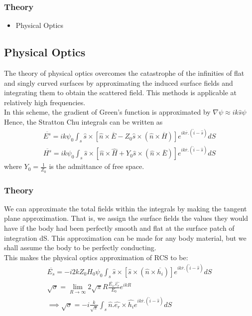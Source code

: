 \documentclass{beamer}
\begin{document}
\begin{frame}
\frametitle{Theory}
\begin{itemize}
 \item Physical Optics
\end{itemize}
\subsection{Physical Optics}
The theory of physical optics overcomes the catastrophe of the infinities of flat and singly curved surfaces by approximating the induced surface fields and integrating them to obtain the scattered field. This methods is applicable at relatively high frequencies.\\
In this scheme, the gradient of Green's function is approximated by $\nabla \psi \approx ik\hat{s}\psi$ Hence, the Stratton Chu integrals can be written as 
\begin{eqnarray}
\overline{E^s} = ik\psi_0 \int_s \hat{s}\times[\hat{n}\times\overline{E} - Z_0\hat{s}\times(\hat{n}\times\overline{H})]e^{ik\overline{r}.(\hat{i} - \hat{s})}dS \\
\overline{H^s} = ik\psi_0 \int_s \hat{s}\times[\hat{n}\times\hat{H} + Y_0\hat{s}\times(\hat{n}\times\overline{E})]e^{ik\overline{r}.(\hat{i}-\hat{s})}dS
\end{eqnarray}
where $ Y_0 = \frac{1}{Z_0}$ is the admittance of free space.\\
\end{frame}
\begin{frame}
\frametitle{Theory}
We can approximate the total fields within the integrals by making the tangent plane approximation. That is, we assign the surface fields the values they would have if the body had been perfectly smooth and flat at the surface patch of integration dS. This approximation can be made for any body material, but we shall assume the body to be perfectly conducting. \\
This makes the physical optics approximation of RCS to be:
\begin{eqnarray}
\overline{E_s} = -i2kZ_0H_0\psi_0 \int_s \hat{s}\times[\hat{s}\times(\hat{n}\times\overline{h_i})]e^{ik\overline{r}.(\hat{i} - \hat{s})}dS \\
\sqrt{\sigma} = \lim_{R\rightarrow\infty} 2\sqrt{\pi}R\frac{\overline{E_s}.\hat{e_r}}{E_0}e^{ikR} \\
\implies \sqrt{\sigma} = -i\frac{k}{\sqrt{\pi}}\int_s \hat{n}.\hat{e_r}\times\hat{h_i}e^{ik\overline{r}.(\hat{i} - \hat{s})}dS
\end{eqnarray}
\end{frame}
\end{document}
